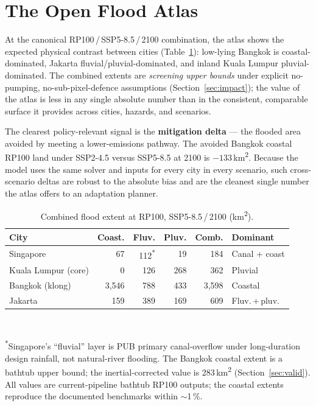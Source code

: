 \documentclass[conference]{IEEEtran}
\begin{document}
\section{The Open Flood Atlas}
At the canonical RP100\,/\,SSP5-8.5\,/\,2100 combination, the atlas shows the expected
physical contrast between cities (Table~\ref{tab:extents}): low-lying Bangkok is
coastal-dominated, Jakarta fluvial/pluvial-dominated, and inland Kuala Lumpur
pluvial-dominated. The combined extents are \emph{screening upper bounds} under
explicit no-pumping, no-sub-pixel-defence assumptions (Section~\ref{sec:impact}); the
value of the atlas is less in any single absolute number than in the consistent,
comparable surface it provides across cities, hazards, and scenarios.

The clearest policy-relevant signal is the \textbf{mitigation delta} --- the flooded
area avoided by meeting a lower-emissions pathway. The avoided Bangkok coastal RP100
land under SSP2-4.5 versus SSP5-8.5 at 2100 is $-133$\,km\textsuperscript{2}. Because
the model uses the same solver and inputs for every city in every scenario, such
cross-scenario deltas are robust to the absolute bias and are the cleanest single
number the atlas offers to an adaptation planner.

\begin{table}[t]
\centering
\caption{Combined flood extent at RP100, SSP5-8.5\,/\,2100 (km\textsuperscript{2}).}
\label{tab:extents}
\begin{tabular}{lrrrrl}
\hline
\textbf{City} & \textbf{Coast.} & \textbf{Fluv.} & \textbf{Pluv.} & \textbf{Comb.} & \textbf{Dominant}\\
\hline
Singapore & 67 & 112\textsuperscript{*} & 19 & 184 & Canal + coast\\
Kuala Lumpur (core) & 0 & 126 & 268 & 362 & Pluvial\\
Bangkok (klong) & 3{,}546 & 788 & 433 & 3{,}598 & Coastal\\
Jakarta & 159 & 389 & 169 & 609 & Fluv.\,+\,pluv.\\
\hline
\end{tabular}\\[3pt]
\begin{minipage}{0.95\linewidth}\footnotesize
\textsuperscript{*}Singapore's ``fluvial'' layer is PUB primary canal-overflow under
long-duration design rainfall, not natural-river flooding. The Bangkok coastal extent
is a bathtub upper bound; the inertial-corrected value is 283\,km\textsuperscript{2}
(Section~\ref{sec:valid}). All values are current-pipeline bathtub RP100 outputs; the
coastal extents reproduce the documented benchmarks within $\sim$1\,\%.
\end{minipage}
\end{table}
\end{document}
